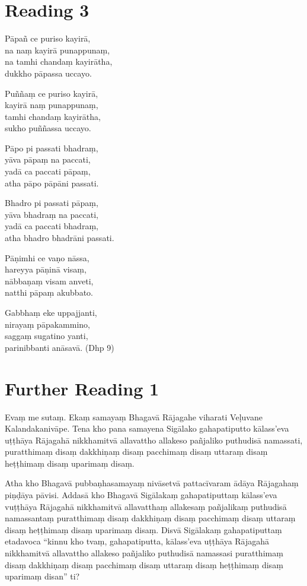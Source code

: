 \section*{Reading 3}

Pāpañ ce puriso kayirā,\\
na naṃ kayirā punappunaṃ,\\
na tamhi chandaṃ kayirātha,\\
dukkho pāpassa uccayo.

Puññaṃ ce puriso kayirā,\\
kayirā naṃ punappunaṃ,\\
tamhi chandaṃ kayirātha,\\
sukho puññassa uccayo.

Pāpo pi passati bhadraṃ,\\
yāva pāpaṃ na paccati,\\
yadā ca paccati pāpaṃ,\\
atha pāpo pāpāni passati.

Bhadro pi passati pāpaṃ,\\
yāva bhadraṃ na paccati,\\
yadā ca paccati bhadraṃ,\\
atha bhadro bhadrāni passati.

Pāṇimhi ce vaṇo nāssa,\\
hareyya pāṇinā visaṃ,\\
nābbaṇaṃ visam anveti,\\
natthi pāpaṃ akubbato.

Gabbhaṃ eke uppajjanti,\\
nirayaṃ pāpakammino,\\
saggaṃ sugatino yanti,\\
parinibbanti anāsavā. \hfill(Dhp 9)

\section*{Further Reading 1}

Evaṃ me sutaṃ. Ekaṃ samayaṃ Bhagavā Rājagahe viharati Veḷuvane Kalandakanivāpe. Tena kho pana samayena Sigālako gahapatiputto kālass’eva uṭṭhāya Rājagahā nikkhamitvā allavattho allakeso pañjaliko puthudisā namassati, puratthimaṃ disaṃ dakkhiṇaṃ disaṃ pacchimaṃ disaṃ uttaraṃ disaṃ heṭṭhimaṃ disaṃ uparimaṃ disaṃ.

Atha kho Bhagavā pubbaṇhasamayaṃ nivāsetvā pattacīvaram ādāya Rājagahaṃ piṇḍāya pāvisi. Addasā kho Bhagavā Sigālakaṃ gahapatiputtaṃ kālass’eva vuṭṭhāya Rājagahā nikkhamitvā allavatthaṃ allakesaṃ pañjalikaṃ puthudisā namassantaṃ puratthimaṃ disaṃ dakkhiṇaṃ disaṃ pacchimaṃ disaṃ uttaraṃ disaṃ heṭṭhimaṃ disaṃ uparimaṃ disaṃ. Disvā Sigālakaṃ gahapatiputtaṃ etadavoca “kinnu kho tvaṃ, gahapatiputta, kālass’eva uṭṭhāya Rājagahā nikkhamitvā allavattho allakeso pañjaliko puthudisā namassasi puratthimaṃ disaṃ dakkhiṇaṃ disaṃ pacchimaṃ disaṃ uttaraṃ disaṃ heṭṭhimaṃ disaṃ uparimaṃ disan” ti?


